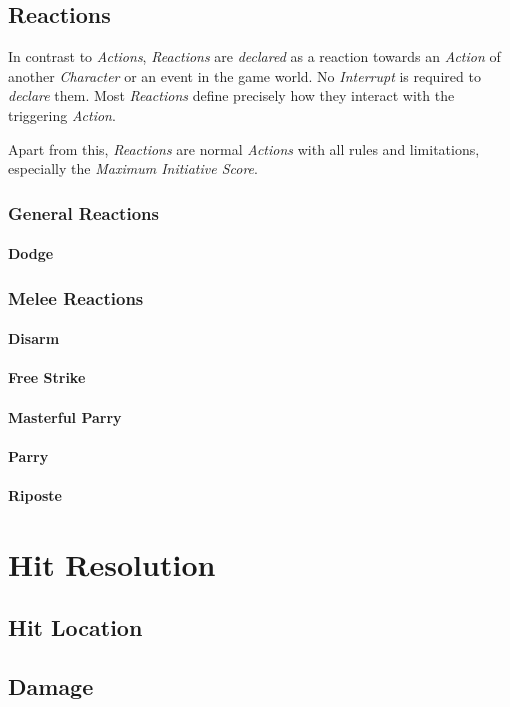 \subsection{Reactions}

In contrast to \emph{Actions}, \emph{Reactions} are \emph{declared} as a reaction
towards an \emph{Action} of another \emph{Character} or an event in the game world.
No \emph{Interrupt} is required to \emph{declare} them. Most \emph{Reactions} define
precisely how they interact with the triggering \emph{Action}.

Apart from this, \emph{Reactions} are normal \emph{Actions} with all rules and
limitations, especially the \emph{Maximum Initiative Score}.

\subsubsection{General Reactions}

\paragraph{Dodge}

\subsubsection{Melee Reactions}

\paragraph{Disarm}

\paragraph{Free Strike}

\paragraph{Masterful Parry}

\paragraph{Parry}

\paragraph{Riposte}

\section{Hit Resolution}

\subsection{Hit Location}

\subsection{Damage}